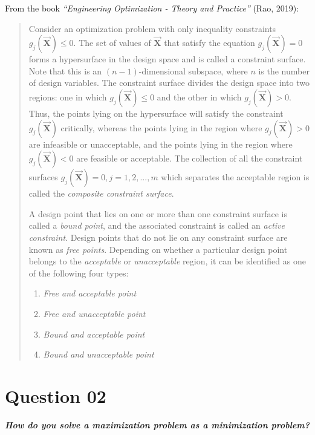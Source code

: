 \documentclass[conference]{IEEEtran}
\begin{document}
From the book \textit{``Engineering Optimization - Theory and Practice''} (Rao, 2019):

\begin{quotation}
	Consider an optimization problem with only inequality constraints $g_j (\vec{\mathbf{X}}) \leq 0$. The set of values of $\vec{\mathbf{X}}$ that satisfy the equation $g_j(\vec{\mathbf{X}}) = 0$ forms a hypersurface in the design space and is called a constraint surface. Note that this is an $\left(n - 1\right)$-dimensional subspace, where $n$ is the number of design variables. The constraint surface divides the design space into two regions: one in which $g_j (\vec{\mathbf{X}}) \le 0$ and the other in which $g_j (\vec{\mathbf{X}}) > 0$. Thus, the points lying on the hypersurface will satisfy the constraint $g_j (\vec{\mathbf{X}})$ critically, whereas the points lying in the region where $g_j (\vec{\mathbf{X}}) > 0$ are infeasible or unacceptable, and the points lying in the region where $g_j (\vec{\mathbf{X}}) < 0$ are feasible or acceptable. The collection of all the constraint surfaces $g_j (\vec{\mathbf{X}}) = 0, j = 1, 2, . . . ,m$ which separates the acceptable region is called the \textit{composite constraint surface}.
	
	A design point that lies on one or more than one constraint surface is called a \textit{bound point}, and the associated constraint is called an\textit{ active constraint}. Design points that do not lie on any constraint surface are known as \textit{free points}. Depending on whether a particular design point belongs to the \textit{acceptable} or \textit{unacceptable} region, it can be identified as one of the following four types:
	
	\begin{enumerate}
		\item \textit{Free and acceptable point}
		\item \textit{Free and unacceptable point}
		\item \textit{Bound and acceptable point}
		\item \textit{Bound and unacceptable point}
	\end{enumerate}

\end{quotation}

\section{Question 02}
\textit{\textbf{How do you solve a maximization problem as a minimization problem?}}
\end{document}
